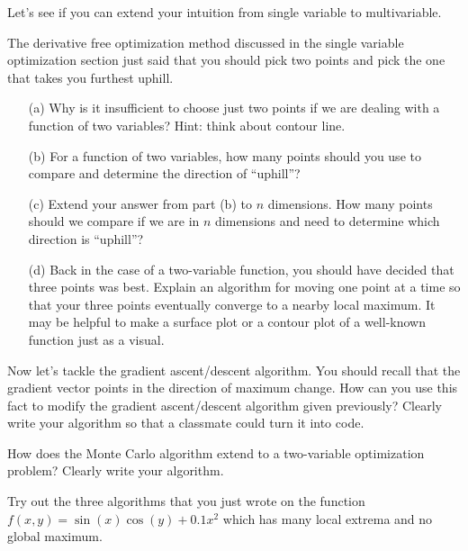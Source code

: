 Let's see if you can extend your intuition from single variable to multivariable.
\begin{problem}
    The derivative free optimization method discussed in the single variable optimization
    section just said that you should pick two points and pick the one that takes you
    furthest uphill.  
    \begin{enumerate}
        \item[(a)] Why is it insufficient to choose just two points if we are dealing with a
            function of two variables?  Hint: think about contour line.
        \item[(b)] For a function of two variables, how many points should you use to
            compare and determine the direction of ``uphill''?
        \item[(c)] Extend your answer from part (b) to $n$ dimensions.  How many points
            should we compare if we are in $n$ dimensions and need to determine which
            direction is ``uphill''?
        \item[(d)] Back in the case of a two-variable function, you should have decided
            that three points was best.  Explain an algorithm for moving one point at a
            time so that your three points eventually converge to a nearby local maximum.
            It may be helpful to make a surface plot or a contour plot of a well-known
            function just as a visual.
    \end{enumerate}
\end{problem}

\begin{problem}
    Now let's tackle the gradient ascent/descent algorithm.  You should recall that the gradient
    vector points in the direction of maximum change.  How can you use this fact to modify
    the gradient ascent/descent algorithm given previously?  Clearly write your algorithm
    so that a classmate could turn it into code.
\end{problem}

\begin{problem}
    How does the Monte Carlo algorithm extend to a two-variable optimization problem?
    Clearly write your algorithm.
\end{problem}

\begin{problem}
    Try out the three algorithms that you just wrote on the function $f(x,y) =
    \sin(x)\cos(y) + 0.1 x^2$ which has many local extrema and no global maximum.
\end{problem}


